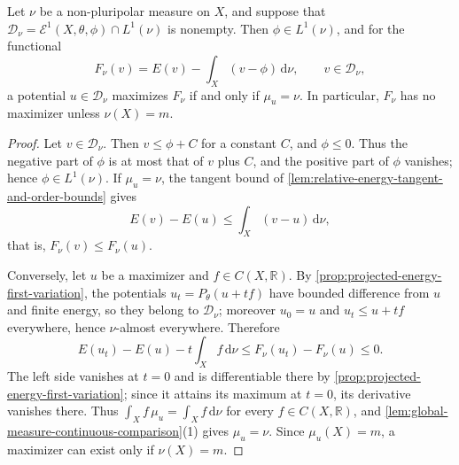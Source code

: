 \begin{theorem}\label{thm:relative-variational-characterization}
Let $\nu$ be a non-pluripolar measure on $X$, and suppose that $\mathcal D_\nu=\mathcal E^1(X,\theta,\phi)\cap L^1(\nu)$ is nonempty. Then $\phi\in L^1(\nu)$, and for the functional
\[
 F_\nu(v)=E(v)-\int_X(v-\phi)\,\mathrm d\nu,
                       \qquad v\in\mathcal D_\nu,
\]
a potential $u\in\mathcal D_\nu$ maximizes $F_\nu$ if and only if $\mu_u=\nu$. In particular, $F_\nu$ has no maximizer unless $\nu(X)=m$.
\end{theorem}
\begin{proof}
Let $v\in\mathcal D_\nu$. Then $v\leq\phi+C$ for a constant $C$, and $\phi\leq0$. Thus the negative part of $\phi$ is at most that of $v$ plus $C$, and the positive part of $\phi$ vanishes; hence $\phi\in L^1(\nu)$. If $\mu_u=\nu$, the tangent bound of \cref{lem:relative-energy-tangent-and-order-bounds} gives
\[
 E(v)-E(u)\leq\int_X(v-u)\,\mathrm d\nu,
\]
that is, $F_\nu(v)\leq F_\nu(u)$.

Conversely, let $u$ be a maximizer and $f\in C(X,\mathbb R)$. By \cref{prop:projected-energy-first-variation}, the potentials $u_t=P_\theta(u+tf)$ have bounded difference from $u$ and finite energy, so they belong to $\mathcal D_\nu$; moreover $u_0=u$ and $u_t\leq u+tf$ everywhere, hence $\nu$-almost everywhere. Therefore
\[
 E(u_t)-E(u)-t\int_Xf\,\mathrm d\nu
       \leq F_\nu(u_t)-F_\nu(u)\leq0.
\]
The left side vanishes at $t=0$ and is differentiable there by \cref{prop:projected-energy-first-variation}; since it attains its maximum at $t=0$, its derivative vanishes there. Thus $\int_Xf\,\mu_u=\int_Xf\,\mathrm d\nu$ for every $f\in C(X,\mathbb R)$, and \cref{lem:global-measure-continuous-comparison}(1) gives $\mu_u=\nu$. Since $\mu_u(X)=m$, a maximizer can exist only if $\nu(X)=m$.
\end{proof}

